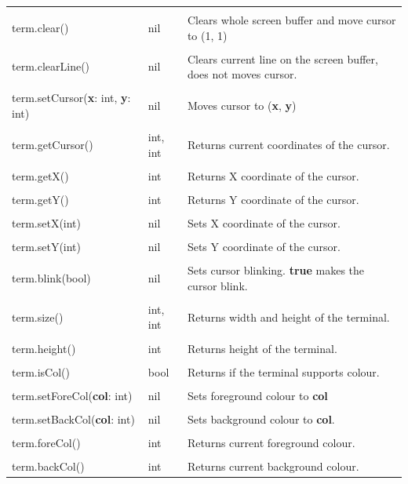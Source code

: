 \documentclass[10pt, stock]{memoir}
\begin{document}
\begin{tabularx}{\textwidth}{l l X}
	\\ \\
	term.clear() & nil & Clears whole screen buffer and move cursor to (1, 1)
	\\ \\
	term.clearLine() & nil & Clears current line on the screen buffer, does not moves cursor.
	\\ \\
	term.setCursor(\textbf{x}: int, \textbf{y}: int) & nil & Moves cursor to (\textbf{x}, \textbf{y})
	\\ \\
	term.getCursor() & int, int & Returns current coordinates of the cursor.
	\\ \\
	term.getX() & int & Returns X coordinate of the cursor.
	\\ \\
	term.getY() & int & Returns Y coordinate of the cursor.
	\\ \\
	term.setX(int) & nil & Sets X coordinate of the cursor.
	\\ \\
	term.setY(int) & nil & Sets Y coordinate of the cursor.
	\\ \\
	term.blink(bool) & nil & Sets cursor blinking. \textbf{true} makes the cursor blink.
	\\ \\
	term.size() & int, int & Returns width and height of the terminal.
	\\ \\
	term.height() & int & Returns height of the terminal. 
	\\ \\
	term.isCol() & bool & Returns if the terminal supports colour.
	\\ \\
	term.setForeCol(\textbf{col}: int) & nil & Sets foreground colour to \textbf{col}
	\\ \\
	term.setBackCol(\textbf{col}: int) & nil & Sets background colour to \textbf{col}.
	\\ \\
	term.foreCol() & int & Returns current foreground colour.
	\\ \\
	term.backCol() & int & Returns current background colour.
\end{tabularx}
\end{document}
